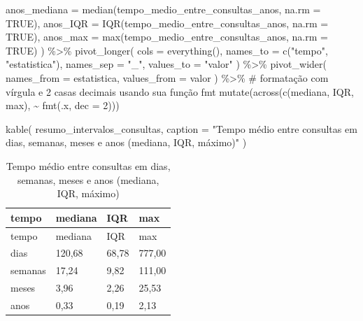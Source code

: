\documentclass[
]{article}
\newenvironment{Shaded}{\begin{snugshade}}{\end{snugshade}}
\newcommand{\AttributeTok}[1]{\textcolor[rgb]{0.40,0.45,0.13}{#1}}
\newcommand{\CommentTok}[1]{\textcolor[rgb]{0.37,0.37,0.37}{#1}}
\newcommand{\ConstantTok}[1]{\textcolor[rgb]{0.56,0.35,0.01}{#1}}
\newcommand{\DecValTok}[1]{\textcolor[rgb]{0.68,0.00,0.00}{#1}}
\newcommand{\FunctionTok}[1]{\textcolor[rgb]{0.28,0.35,0.67}{#1}}
\newcommand{\NormalTok}[1]{\textcolor[rgb]{0.00,0.23,0.31}{#1}}
\newcommand{\SpecialCharTok}[1]{\textcolor[rgb]{0.37,0.37,0.37}{#1}}
\newcommand{\StringTok}[1]{\textcolor[rgb]{0.13,0.47,0.30}{#1}}
\begin{document}
\begin{Shaded}
\begin{Highlighting}[]
    \AttributeTok{anos\_mediana    =} \FunctionTok{median}\NormalTok{(tempo\_medio\_entre\_consultas\_anos, }\AttributeTok{na.rm =} \ConstantTok{TRUE}\NormalTok{),}
    \AttributeTok{anos\_IQR        =} \FunctionTok{IQR}\NormalTok{(tempo\_medio\_entre\_consultas\_anos, }\AttributeTok{na.rm =} \ConstantTok{TRUE}\NormalTok{),}
    \AttributeTok{anos\_max        =} \FunctionTok{max}\NormalTok{(tempo\_medio\_entre\_consultas\_anos, }\AttributeTok{na.rm =} \ConstantTok{TRUE}\NormalTok{)}
\NormalTok{  ) }\SpecialCharTok{\%\textgreater{}\%}
  \FunctionTok{pivot\_longer}\NormalTok{(}
    \AttributeTok{cols =} \FunctionTok{everything}\NormalTok{(),}
    \AttributeTok{names\_to =} \FunctionTok{c}\NormalTok{(}\StringTok{"tempo"}\NormalTok{, }\StringTok{"estatistica"}\NormalTok{),}
    \AttributeTok{names\_sep =} \StringTok{"\_"}\NormalTok{,}
    \AttributeTok{values\_to =} \StringTok{"valor"}
\NormalTok{  ) }\SpecialCharTok{\%\textgreater{}\%}
  \FunctionTok{pivot\_wider}\NormalTok{(}
    \AttributeTok{names\_from =}\NormalTok{ estatistica,}
    \AttributeTok{values\_from =}\NormalTok{ valor}
\NormalTok{  ) }\SpecialCharTok{\%\textgreater{}\%}
  \CommentTok{\# formatação com vírgula e 2 casas decimais usando sua função \textasciigrave{}fmt\textasciigrave{}}
  \FunctionTok{mutate}\NormalTok{(}\FunctionTok{across}\NormalTok{(}\FunctionTok{c}\NormalTok{(mediana, IQR, max), }\SpecialCharTok{\textasciitilde{}} \FunctionTok{fmt}\NormalTok{(.x, }\AttributeTok{dec =} \DecValTok{2}\NormalTok{)))}

\FunctionTok{kable}\NormalTok{(}
\NormalTok{  resumo\_intervalos\_consultas,}
  \AttributeTok{caption =} \StringTok{"Tempo médio entre consultas em dias, semanas, meses e anos (mediana, IQR, máximo)"}
\NormalTok{)}
\end{Highlighting}
\end{Shaded}

\begin{longtable}[]{@{}llll@{}}
\caption{Tempo médio entre consultas em dias, semanas, meses e anos
(mediana, IQR, máximo)}\tabularnewline
\toprule\noalign{}
tempo & mediana & IQR & max \\
\midrule\noalign{}
\endfirsthead
\toprule\noalign{}
tempo & mediana & IQR & max \\
\midrule\noalign{}
\endhead
\bottomrule\noalign{}
\endlastfoot
dias & 120,68 & 68,78 & 777,00 \\
semanas & 17,24 & 9,82 & 111,00 \\
meses & 3,96 & 2,26 & 25,53 \\
anos & 0,33 & 0,19 & 2,13 \\
\end{longtable}
\end{document}
